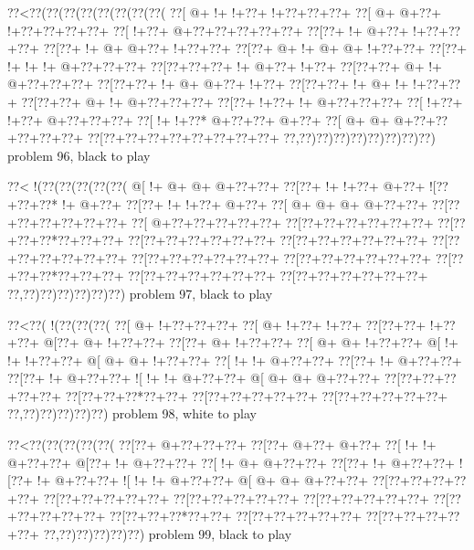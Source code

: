 \vbox{\vbox{\goo
\0??<\0??(\0??(\0??(\0??(\0??(\0??(\0??(\0??(
\0??[\- @+\- !+\- !+\0??+\- !+\0??+\0??+\0??+
\0??[\- @+\- @+\0??+\- !+\0??+\0??+\0??+\0??+
\0??[\- !+\0??+\- @+\0??+\0??+\0??+\0??+\0??+
\0??[\0??+\- !+\- @+\0??+\- !+\0??+\0??+\0??+
\0??[\0??+\- !+\- @+\- @+\0??+\- !+\0??+\0??+
\0??[\0??+\- @+\- !+\- @+\- @+\- !+\0??+\0??+
\0??[\0??+\- !+\- !+\- !+\- @+\0??+\0??+\0??+
\0??[\0??+\0??+\0??+\- !+\- @+\0??+\- !+\0??+
\0??[\0??+\0??+\- @+\- !+\- @+\0??+\0??+\0??+
\0??[\0??+\0??+\- !+\- @+\- @+\0??+\- !+\0??+
\0??[\0??+\0??+\- !+\- @+\- !+\- !+\0??+\0??+
\0??[\0??+\0??+\- @+\- !+\- @+\0??+\0??+\0??+
\0??[\0??+\- !+\0??+\- !+\- @+\0??+\0??+\0??+
\0??[\- !+\0??+\- !+\0??+\- @+\0??+\0??+\0??+
\0??[\- !+\- !+\0??*\- @+\0??+\0??+\- @+\0??+
\0??[\- @+\- @+\- @+\0??+\0??+\0??+\0??+\0??+
\0??[\0??+\0??+\0??+\0??+\0??+\0??+\0??+\0??+
\0??,\0??)\0??)\0??)\0??)\0??)\0??)\0??)\0??)
}
\hfil problem 96, black to play\hfil\break
}

\vbox{\vbox{\goo
\0??<\- !(\0??(\0??(\0??(\0??(\0??(
\- @[\- !+\- @+\- @+\- @+\0??+\0??+
\0??[\0??+\- !+\- !+\0??+\- @+\0??+
\- ![\0??+\0??+\0??*\- !+\- @+\0??+
\0??[\0??+\- !+\- !+\0??+\- @+\0??+
\0??[\- @+\- @+\- @+\- @+\0??+\0??+
\0??[\0??+\0??+\0??+\0??+\0??+\0??+
\0??[\- @+\0??+\0??+\0??+\0??+\0??+
\0??[\0??+\0??+\0??+\0??+\0??+\0??+
\0??[\0??+\0??+\0??*\0??+\0??+\0??+
\0??[\0??+\0??+\0??+\0??+\0??+\0??+
\0??[\0??+\0??+\0??+\0??+\0??+\0??+
\0??[\0??+\0??+\0??+\0??+\0??+\0??+
\0??[\0??+\0??+\0??+\0??+\0??+\0??+
\0??[\0??+\0??+\0??+\0??+\0??+\0??+
\0??[\0??+\0??+\0??*\0??+\0??+\0??+
\0??[\0??+\0??+\0??+\0??+\0??+\0??+
\0??[\0??+\0??+\0??+\0??+\0??+\0??+
\0??,\0??)\0??)\0??)\0??)\0??)\0??)
}
\hfil problem 97, black to play\hfil\break
}

\vbox{\vbox{\goo
\0??<\0??(\- !(\0??(\0??(\0??(
\0??[\- @+\- !+\0??+\0??+\0??+
\0??[\- @+\- !+\0??+\- !+\0??+
\0??[\0??+\0??+\- !+\0??+\0??+
\- @[\0??+\- @+\- !+\0??+\0??+
\0??[\0??+\- @+\- !+\0??+\0??+
\0??[\- @+\- @+\- !+\0??+\0??+
\- @[\- !+\- !+\- !+\0??+\0??+
\- @[\- @+\- @+\- !+\0??+\0??+
\0??[\- !+\- !+\- @+\0??+\0??+
\0??[\0??+\- !+\- @+\0??+\0??+
\0??[\0??+\- !+\- @+\0??+\0??+
\- ![\- !+\- !+\- @+\0??+\0??+
\- @[\- @+\- @+\- @+\0??+\0??+
\0??[\0??+\0??+\0??+\0??+\0??+
\0??[\0??+\0??+\0??*\0??+\0??+
\0??[\0??+\0??+\0??+\0??+\0??+
\0??[\0??+\0??+\0??+\0??+\0??+
\0??,\0??)\0??)\0??)\0??)\0??)
}
\hfil problem 98, white to play\hfil\break
}

\vbox{\vbox{\goo
\0??<\0??(\0??(\0??(\0??(\0??(
\0??[\0??+\- @+\0??+\0??+\0??+
\0??[\0??+\- @+\0??+\- @+\0??+
\0??[\- !+\- !+\- @+\0??+\0??+
\- @[\0??+\- !+\- @+\0??+\0??+
\0??[\- !+\- @+\- @+\0??+\0??+
\0??[\0??+\- !+\- @+\0??+\0??+
\- ![\0??+\- !+\- @+\0??+\0??+
\- ![\- !+\- !+\- @+\0??+\0??+
\- @[\- @+\- @+\- @+\0??+\0??+
\0??[\0??+\0??+\0??+\0??+\0??+
\0??[\0??+\0??+\0??+\0??+\0??+
\0??[\0??+\0??+\0??+\0??+\0??+
\0??[\0??+\0??+\0??+\0??+\0??+
\0??[\0??+\0??+\0??+\0??+\0??+
\0??[\0??+\0??+\0??*\0??+\0??+
\0??[\0??+\0??+\0??+\0??+\0??+
\0??[\0??+\0??+\0??+\0??+\0??+
\0??,\0??)\0??)\0??)\0??)\0??)
}
\hfil problem 99, black to play\hfil\break
}

